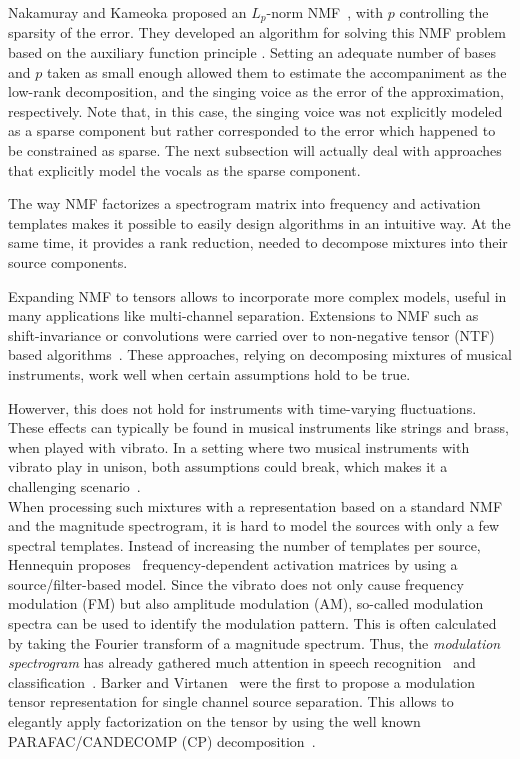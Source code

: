 Nakamuray and Kameoka proposed an $L_p$-norm NMF~\cite{nakamuray15}, with $p$ controlling the sparsity of the error. They developed an algorithm for solving this NMF problem based on the auxiliary function principle \cite{ortega70,kameoka06}. Setting an adequate number of bases and $p$ taken as small enough allowed them to estimate the accompaniment as the low-rank decomposition, and the singing voice as the error of the approximation, respectively. Note that, in this case, the singing voice was not explicitly modeled as a sparse component but rather corresponded to the error which happened to be constrained as sparse. The next subsection will actually deal with approaches that explicitly model the vocals as the sparse component.
\par
The way NMF factorizes a spectrogram matrix into frequency and activation templates makes it possible to easily design algorithms in an intuitive way. At the same time, it provides a rank reduction, needed to decompose mixtures into their source components.
\par
Expanding NMF to tensors allows to incorporate more complex models, useful in many applications like multi-channel separation.
Extensions to NMF such as shift-invariance or convolutions were carried over to non-negative tensor (NTF) based algorithms~\cite{fitzgerald05, fitzgerald08, fitzgerald06, fevotte10, ozerov11}. These approaches, relying on decomposing mixtures of musical instruments, work well when certain assumptions hold to be true.

Howerver, this does not hold for instruments with time-varying fluctuations. These effects can typically be found in musical instruments like strings and brass, when played with vibrato. In a setting where two musical instruments with vibrato play in unison, both assumptions could break, which makes it a challenging scenario~\cite{stoeter14}.\\
When processing such mixtures with a representation based on a standard NMF and the magnitude spectrogram, it is hard to model the sources with only a few spectral templates. Instead of increasing the number of templates per source, Hennequin proposes~\cite{hennequin11} frequency-dependent activation matrices by using a source/filter-based model.
Since the vibrato does not only cause frequency modulation (FM) but also amplitude modulation (AM), so-called modulation spectra can be used to identify the modulation pattern. This is often calculated by taking the Fourier transform of a magnitude spectrum. Thus, the \emph{modulation spectrogram} has already gathered much attention in speech recognition~\cite{greenberg97,kingsbury98} and classification~\cite{kinnunen08, markaki09}.
Barker and Virtanen~\cite{barker13} were the first to propose a modulation tensor representation for single channel source separation. This allows to elegantly apply factorization on the tensor by using the well known PARAFAC/CANDECOMP (CP) decomposition~\cite{cichocki09}.\\

